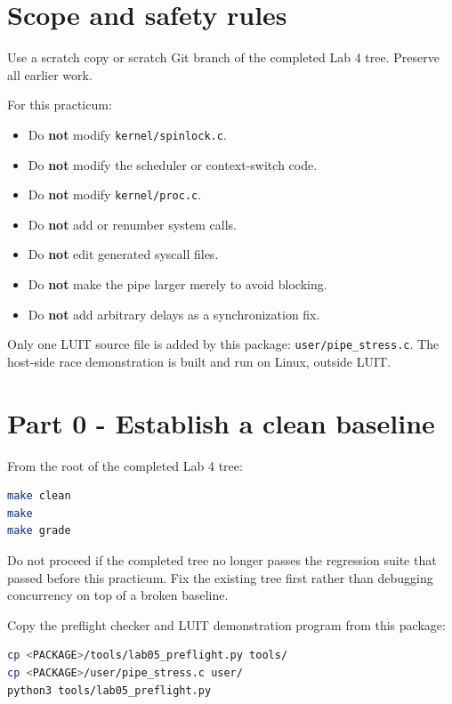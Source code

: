 \documentclass[11pt,a4paper]{article}
\newcommand{\file}[1]{\texttt{#1}}
\begin{document}
\section{Scope and safety rules}

Use a scratch copy or scratch Git branch of the completed Lab 4 tree. Preserve all earlier work.

For this practicum:

\begin{itemize}[leftmargin=7mm]
\item Do \textbf{not} modify \file{kernel/spinlock.c}.
\item Do \textbf{not} modify the scheduler or context-switch code.
\item Do \textbf{not} modify \file{kernel/proc.c}.
\item Do \textbf{not} add or renumber system calls.
\item Do \textbf{not} edit generated syscall files.
\item Do \textbf{not} make the pipe larger merely to avoid blocking.
\item Do \textbf{not} add arbitrary delays as a synchronization fix.
\end{itemize}

Only one LUIT source file is added by this package: \file{user/pipe\_stress.c}. The host-side race demonstration is built and run on Linux, outside LUIT.

\section{Part 0 - Establish a clean baseline}

From the root of the completed Lab 4 tree:

\begin{lstlisting}[language=bash]
make clean
make
make grade
\end{lstlisting}

Do not proceed if the completed tree no longer passes the regression suite that passed before this practicum. Fix the existing tree first rather than debugging concurrency on top of a broken baseline.

Copy the preflight checker and LUIT demonstration program from this package:

\begin{lstlisting}[language=bash]
cp <PACKAGE>/tools/lab05_preflight.py tools/
cp <PACKAGE>/user/pipe_stress.c user/
python3 tools/lab05_preflight.py
\end{lstlisting}
\end{document}
